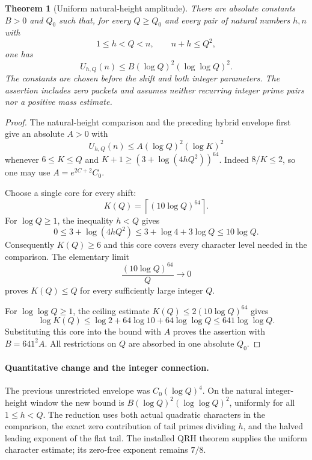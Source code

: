 \documentclass[11pt]{article}
\newtheorem{theorem}{Theorem}[section]
\begin{document}
\begin{theorem}[Uniform natural-height amplitude]\label{thm:uniform-natural-amplitude}
There are absolute constants \(B>0\) and \(Q_0\) such that, for
every \(Q\geq Q_0\) and every pair of natural numbers \(h,n\) with
\[
               1\leq h<Q<n,\qquad n+h\leq Q^2,
\]
one has
\[
           U_{h,Q}(n)\leq
                 B(\log Q)^2(\log\log Q)^2.
\]
The constants are chosen before the shift and both integer parameters.
The assertion includes zero packets and assumes neither recurring
integer prime pairs nor a positive mass estimate.
\end{theorem}
\begin{proof}
The natural-height comparison and the preceding hybrid envelope first
give an absolute \(A>0\) with
\[
 U_{h,Q}(n)\leq A(\log Q)^2(\log K)^2
\]
whenever \(6\leq K\leq Q\) and
\(K+1\geq(3+\log(4hQ^2))^{64}\).
Indeed \(8/K\leq2\), so one may use
\(A=e^{2C+2}C_0\).

Choose a single core for every shift:
\[
                  K(Q)=\left\lceil(10\log Q)^{64}\right\rceil.
\]
For \(\log Q\geq1\), the inequality \(h<Q\) gives
\[
 0\leq3+\log(4hQ^2)
       \leq3+\log4+3\log Q\leq10\log Q.
\]
Consequently \(K(Q)\geq6\) and this core covers every character level
needed in the comparison. The elementary limit
\[
                    \frac{(10\log Q)^{64}}Q\longrightarrow0
\]
proves \(K(Q)\leq Q\) for every sufficiently large integer \(Q\).

For \(\log\log Q\geq1\), the ceiling estimate
\(K(Q)\leq2(10\log Q)^{64}\) gives
\[
 \log K(Q)\leq\log2+64\log10+64\log\log Q
                       \leq641\log\log Q.
\]
Substituting this core into the bound with \(A\) proves the assertion
with \(B=641^2A\). All restrictions on \(Q\) are absorbed in one
absolute \(Q_0\).
\end{proof}

\paragraph{Quantitative change and the integer connection.}
The previous unrestricted envelope was \(C_0(\log Q)^4\).
On the natural integer-height window the new bound is
\(B(\log Q)^2(\log\log Q)^2\), uniformly for all \(1\leq h<Q\).
The reduction uses both actual quadratic characters in the comparison,
the exact zero contribution of tail primes dividing \(h\), and the
halved leading exponent of the flat tail. The installed QRH theorem
supplies the uniform character estimate; its zero-free exponent remains
\(7/8\).
\end{document}
